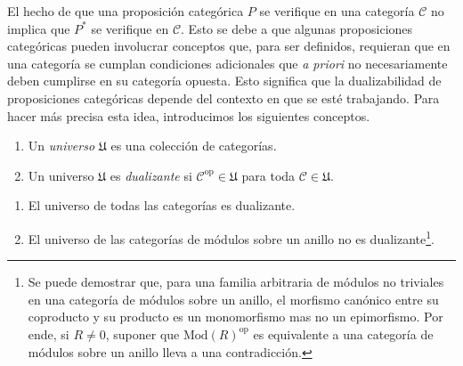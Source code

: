 \documentclass[tesis]{subfiles}
\begin{document}
El hecho de que una proposición categórica $P$ se verifique en una categoría $\mathscr{C}$ no implica que $P^\ast$ se verifique en $\mathscr{C}$. Esto se debe a que algunas proposiciones categóricas pueden involucrar conceptos que, para ser definidos, requieran que en una categoría se cumplan condiciones adicionales que \emph{a priori} no necesariamente deben cumplirse en su categoría opuesta. Esto significa que la dualizabilidad de proposiciones categóricas depende del contexto en que se esté trabajando. Para hacer más precisa esta idea, introducimos los siguientes conceptos.

\begin{Def}\label{Def: Universos}\leavevmode
    
    \begin{enumerate}[label=(\alph*)]
    
        \item Un \emph{universo} $\mathfrak{U}$ es una colección de categorías.

        \item Un universo $\mathfrak{U}$ es \emph{dualizante} si $\mathscr{C}^\text{op}\in \mathfrak{U}$ para toda $\mathscr{C}\in \mathfrak{U}$.
    \end{enumerate}
\end{Def}

\begin{Ejem}\label{Ejem: Universos}\leavevmode
    \begin{enumerate}[label=(\arabic*)]
    
        \item El universo de todas las categorías es dualizante.

        \item El universo de las categorías de módulos sobre un anillo no es dualizante\footnote{Se puede demostrar que, para una familia arbitraria de módulos no triviales en una categoría de módulos sobre un anillo, el morfismo canónico entre su coproducto y su producto es un monomorfismo mas no un epimorfismo. Por ende, si $R\neq0$, suponer que $\text{Mod}(R)^\text{op}$ es equivalente a una categoría de módulos sobre un anillo lleva a una contradicción.}.
    \end{enumerate}
\end{Ejem}

%
\end{document}
